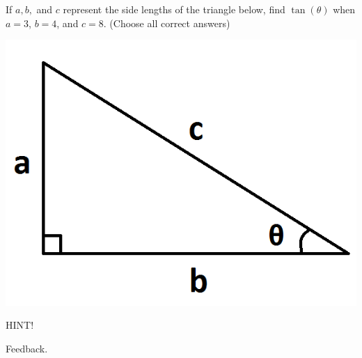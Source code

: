 \documentclass{ximera}
\begin{document}
\begin{problem} 

\begin{problem}
    
    If $a, b,$ and $c$ represent the side lengths of the triangle below, find $\tan(\theta)$ when $a = 3$, $b = 4$, and $c = 8$.  (Choose all correct answers)
    
    \begin{center} \includegraphics[scale=0.3]{Triangle.png} \end{center}
    
    \begin{hint}
    HINT!
    \end{hint}

  \begin{selectAll}
      
      \begin{feedback}[attempt]
          Feedback.
      \end{feedback}
      
  \end{selectAll}
  
\end{problem}

\begin{question}
  

\end{question}
\end{problem}
\end{document}
